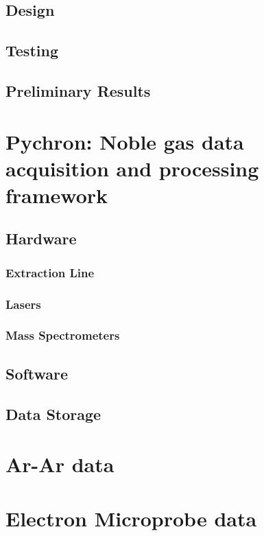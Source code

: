 \documentclass[12pt]{report}
\begin{document}
\section{Design}
\section{Testing}
\section{Preliminary Results}
\chapter{Pychron: Noble gas data acquisition and processing framework}
\section{Hardware}
\subsection{Extraction Line}
\subsection{Lasers}
\subsection{Mass Spectrometers}
\section{Software}
\section{Data Storage}

\appendix
\chapter{Ar-Ar data}
\chapter{Electron Microprobe data}



\nocite{*} %

% 
%
%
%
\begin{References}[99]
%
%


\end{References}
\copyrightpage
\end{document}
